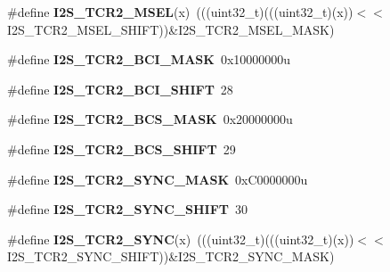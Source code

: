 \begin{DoxyCompactItemize}
\item 
\#define {\bfseries I2\+S\+\_\+\+T\+C\+R2\+\_\+\+M\+S\+EL}(x)~(((uint32\+\_\+t)(((uint32\+\_\+t)(x))$<$$<$I2\+S\+\_\+\+T\+C\+R2\+\_\+\+M\+S\+E\+L\+\_\+\+S\+H\+I\+FT))\&I2\+S\+\_\+\+T\+C\+R2\+\_\+\+M\+S\+E\+L\+\_\+\+M\+A\+SK)\hypertarget{group__I2S__Register__Masks_ga25200cfc40c741f71b96bb14ada7c47f}{}\label{group__I2S__Register__Masks_ga25200cfc40c741f71b96bb14ada7c47f}

\item 
\#define {\bfseries I2\+S\+\_\+\+T\+C\+R2\+\_\+\+B\+C\+I\+\_\+\+M\+A\+SK}~0x10000000u\hypertarget{group__I2S__Register__Masks_ga1e16e8f58e2213ea6ea8fbe96f6b0b09}{}\label{group__I2S__Register__Masks_ga1e16e8f58e2213ea6ea8fbe96f6b0b09}

\item 
\#define {\bfseries I2\+S\+\_\+\+T\+C\+R2\+\_\+\+B\+C\+I\+\_\+\+S\+H\+I\+FT}~28\hypertarget{group__I2S__Register__Masks_gaa9612abbad00a02a4d3dc1a7dfe6463d}{}\label{group__I2S__Register__Masks_gaa9612abbad00a02a4d3dc1a7dfe6463d}

\item 
\#define {\bfseries I2\+S\+\_\+\+T\+C\+R2\+\_\+\+B\+C\+S\+\_\+\+M\+A\+SK}~0x20000000u\hypertarget{group__I2S__Register__Masks_ga8969a374d290181e8f2c7a1c5ff4f31b}{}\label{group__I2S__Register__Masks_ga8969a374d290181e8f2c7a1c5ff4f31b}

\item 
\#define {\bfseries I2\+S\+\_\+\+T\+C\+R2\+\_\+\+B\+C\+S\+\_\+\+S\+H\+I\+FT}~29\hypertarget{group__I2S__Register__Masks_ga4f9b5cf67219ec5115ced3b69bfda155}{}\label{group__I2S__Register__Masks_ga4f9b5cf67219ec5115ced3b69bfda155}

\item 
\#define {\bfseries I2\+S\+\_\+\+T\+C\+R2\+\_\+\+S\+Y\+N\+C\+\_\+\+M\+A\+SK}~0x\+C0000000u\hypertarget{group__I2S__Register__Masks_ga2626d37b42ede711d867e8f750fb2c2c}{}\label{group__I2S__Register__Masks_ga2626d37b42ede711d867e8f750fb2c2c}

\item 
\#define {\bfseries I2\+S\+\_\+\+T\+C\+R2\+\_\+\+S\+Y\+N\+C\+\_\+\+S\+H\+I\+FT}~30\hypertarget{group__I2S__Register__Masks_ga7817b4e017fd01d7ca9a59e87008656f}{}\label{group__I2S__Register__Masks_ga7817b4e017fd01d7ca9a59e87008656f}

\item 
\#define {\bfseries I2\+S\+\_\+\+T\+C\+R2\+\_\+\+S\+Y\+NC}(x)~(((uint32\+\_\+t)(((uint32\+\_\+t)(x))$<$$<$I2\+S\+\_\+\+T\+C\+R2\+\_\+\+S\+Y\+N\+C\+\_\+\+S\+H\+I\+FT))\&I2\+S\+\_\+\+T\+C\+R2\+\_\+\+S\+Y\+N\+C\+\_\+\+M\+A\+SK)\hypertarget{group__I2S__Register__Masks_gaf91c3899959e7f1cf7e0a464df66a8e2}{}\label{group__I2S__Register__Masks_gaf91c3899959e7f1cf7e0a464df66a8e2}


\end{DoxyCompactItemize}
